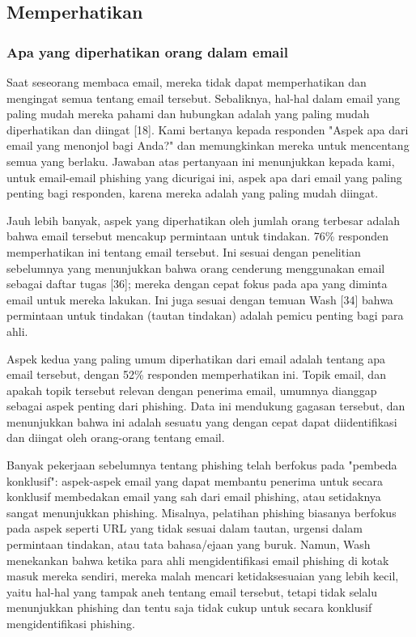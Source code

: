 \documentclass[lettersize,journal]{IEEEtran}
\begin{document}
\subsection{Memperhatikan}

\subsubsection{Apa yang diperhatikan orang dalam email}

Saat seseorang membaca email, mereka tidak dapat memperhatikan dan mengingat
semua tentang email tersebut. Sebaliknya, hal-hal dalam email yang paling mudah
mereka pahami dan hubungkan adalah yang paling mudah diperhatikan dan diingat
  [18]. Kami bertanya kepada responden "Aspek apa dari email yang menonjol bagi
Anda?" dan memungkinkan mereka untuk mencentang semua yang berlaku. Jawaban
atas pertanyaan ini menunjukkan kepada kami, untuk email-email phishing yang
dicurigai ini, aspek apa dari email yang paling penting bagi responden, karena
mereka adalah yang paling mudah diingat.

Jauh lebih banyak, aspek yang diperhatikan oleh jumlah orang terbesar adalah
bahwa email tersebut mencakup permintaan untuk tindakan. 76\% responden
memperhatikan ini tentang email tersebut. Ini sesuai dengan penelitian
sebelumnya yang menunjukkan bahwa orang cenderung menggunakan email sebagai
daftar tugas [36]; mereka dengan cepat fokus pada apa yang diminta email untuk
mereka lakukan. Ini juga sesuai dengan temuan Wash [34] bahwa permintaan untuk
tindakan (tautan tindakan) adalah pemicu penting bagi para ahli.

Aspek kedua yang paling umum diperhatikan dari email adalah tentang apa email
tersebut, dengan 52\% responden memperhatikan ini. Topik email, dan apakah
topik tersebut relevan dengan penerima email, umumnya dianggap sebagai aspek
penting dari phishing. Data ini mendukung gagasan tersebut, dan menunjukkan
bahwa ini adalah sesuatu yang dengan cepat dapat diidentifikasi dan diingat
oleh orang-orang tentang email.

Banyak pekerjaan sebelumnya tentang phishing telah berfokus pada "pembeda
konklusif": aspek-aspek email yang dapat membantu penerima untuk secara
konklusif membedakan email yang sah dari email phishing, atau setidaknya sangat
menunjukkan phishing. Misalnya, pelatihan phishing biasanya berfokus pada aspek
seperti URL yang tidak sesuai dalam tautan, urgensi dalam permintaan tindakan,
atau tata bahasa/ejaan yang buruk. Namun, Wash menekankan bahwa ketika para
ahli mengidentifikasi email phishing di kotak masuk mereka sendiri, mereka
malah mencari ketidaksesuaian yang lebih kecil, yaitu hal-hal yang tampak aneh
tentang email tersebut, tetapi tidak selalu menunjukkan phishing dan tentu saja
tidak cukup untuk secara konklusif mengidentifikasi phishing.
\end{document}
